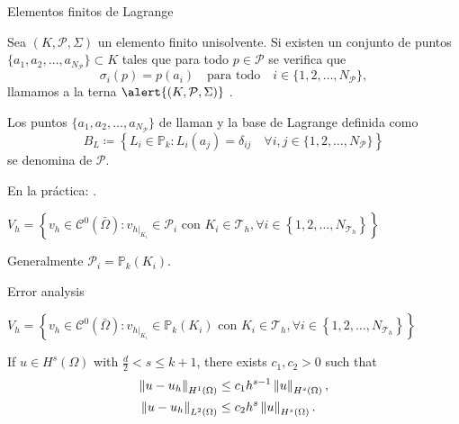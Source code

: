 \begin{frame}{Elementos finitos de Lagrange}
	\scriptsize
\begin{definicion}
	Sea $\left(K,\mathcal{P},\Sigma\right)$ un elemento finito unisolvente. Si existen un conjunto de puntos $\{a_1,a_2,\ldots,a_{N_\mathcal{P}}\}\subset K$ tales que para todo $p\in\mathcal{P}$ se verifica que $$\sigma_i(p)=p(a_i)\quad\text{para todo}\quad i\in\{1,2,\ldots,N_{\mathcal{P}}\},$$ llamamos a la terna $\alert{\left(K,\mathcal{P},\Sigma\right)}$ .
	
	Los puntos $\{a_1,a_2,\ldots,a_{N_\mathcal{P}}\}$ de llaman  y la base de Lagrange definida como $$B_L\coloneqq\left\{L_i\in\mathbb{P}_k\colon L_i(a_j)=\delta_{ij}\quad\forall i,j\in\{1,2,\ldots,N_\mathcal{P}\} \right\}$$ se denomina  de $\mathcal{P}$.
\end{definicion}
En la práctica: .

\begin{block}{}
	\begin{center}
	$V_h=\left\{v_h\in \mathcal{C}^0\left(\bar\Omega\right)\colon v_{h|_{K_i}}\in \mathcal{P}_i \text{ con } K_i\in\mathcal{T}_h, \forall i\in\left\{1,2,\ldots,N_{\mathcal{T}_h} \right\}\right\}$
	\end{center}
	\end{block}
	
	
	Generalmente $\mathcal{P}_i=\mathbb{P}_k(K_i)$.
\end{frame}

\begin{frame}{Error analysis}
	\begin{block}{}
		\begin{center}
		$V_h=\left\{v_h\in \mathcal{C}^0\left(\bar\Omega\right)\colon v_{h|_{K_i}}\in \mathbb{P}_k(K_i) \text{ con } K_i\in\mathcal{T}_h, \forall i\in\left\{1,2,\ldots,N_{\mathcal{T}_h} \right\}\right\}$
		\end{center}
	\end{block}

	\vspace*{1cm}
	\begin{theorem}
		If $u\in H^s(\Omega)$ with $\frac{d}{2}<s\le k+1$, there exists $c_1,c_2>0$ such that
		\begin{align*}
			\left\|u-u_h\right\|_{H^1(\Omega)}&\le c_1 h^{s-1}\left\|u\right\|_{H^s(\Omega)},\\
			\left\|u-u_h\right\|_{L^2(\Omega)}&\le c_2 h^{s}\left\|u\right\|_{H^s(\Omega)}.
		\end{align*}
	\end{theorem}
\end{frame}

